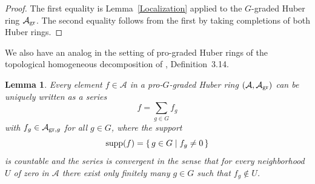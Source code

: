 \documentclass[12pt,twoside,a4paper]{article}
\newtheorem{lemma}[thm]{Lemma}
\theoremstyle{definition}
\theoremstyle{remark}
\newcommand\gr{{\rm gr}}
\newcommand\supp{{\rm supp}}
\begin{document}
\begin{proof}The first equality is Lemma~\ref{Localization} applied to the $G$-graded Huber ring $\mathcal{A}_{\gr}$. The second equality follows from the first by taking completions of both Huber rings. \end{proof} 
We also have an analog in the setting of pro-graded Huber rings of the topological homogeneous decomposition of \cite{Ishizuka-Yoshikawa25}, Definition~3.14.
\begin{lemma}\label{Topological homogeneous decomposition}Every element $f\in\mathcal{A}$ in a pro-$G$-graded Huber ring $(\mathcal{A}, \mathcal{A}_{\gr})$ can be uniquely written as a series \begin{equation*}f=\sum_{g\in G}f_{g}\end{equation*}with $f_{g}\in \mathcal{A}_{\gr, g}$ for all $g\in G$, where the support \begin{equation*}\supp(f)=\{\, g\in G\mid f_{g}\neq0\,\}\end{equation*}is countable and the series is convergent in the sense that for every neighborhood $U$ of zero in $\mathcal{A}$ there exist only finitely many $g\in G$ such that $f_{g}\not\in U$. \end{lemma}
\end{document}

